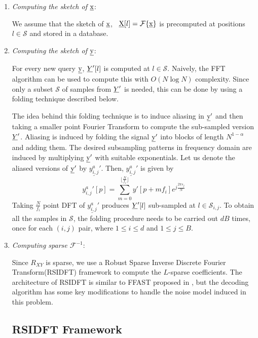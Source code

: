 \begin{enumerate}
	\item[\RNum{1}] \textit{Computing the sketch of $\underline{\mathrm{x}}$}: 
	
	 We assume that the sketch of $\underline{\mathrm{x}}$, \ $ \underline{\mathrm{X}}[l] = \mathcal{F}\{\underline{\mathrm{x}}\}$ is precomputed at positions $l \in \mathcal{S}$ and stored in a database.  
	
	\item[\RNum{2}] \textit{Computing the sketch of $\underline{\mathrm{y}}$}:
	
	 For every new query $\underline{\mathrm{y}}$, $ \underline{Y}'[l]$ is computed at $l \in \mathcal{S}$. Naively, the FFT algorithm can be used to compute this with $O(N \log N)$ complexity. Since only a subset $\mathcal{S}$ of samples from $\underline{Y}'$ is needed, this can be done by using a folding technique described below.
	 
	  The idea behind this folding technique is to induce aliasing in $\underline{\mathrm{y}}'$ and then taking a smaller point Fourier Transform to compute the sub-sampled version $\underline{Y}'$. Aliasing is induced by folding the signal $\underline{\mathrm{y}}'$ into blocks of length $N^{1-\alpha}$ and adding them. The desired subsampling patterns in frequency domain are induced by multiplying $\underline{\mathrm{y}}'$ with suitable exponentials. Let us denote the aliased versions of $\underline{\mathrm{y}}'$ by $\underline{y^{a}_{i,j}}'$. Then, $\underline{y^{a}_{i,j}}'$ is given by
	  \begin{equation}
	  	{y^{a}_{i,j}}'[p] = \sum \limits_{m = 0}^{\lfloor{\frac{N}{f_i}}\rfloor} y'[p + mf_i] e^{j \frac{2 \pi s_j}{N} } 
	  \end{equation}
	  Taking $\frac{N}{f_i}$ point DFT of $\underline{y^{a}_{i,j}}'$ produces $\underline{Y}'[l]$ sub-sampled at $l \in \mathcal{S}_{i,j}$. To obtain all the samples in $\mathcal{S}$, the folding procedure needs to be carried out $dB$ times, once for each $(i,j)$ pair, where $1 \leq i \leq d $ and  $1 \leq j \leq B $.  
	       
	\item[\RNum{3}] \textit{Computing sparse $\mathcal{F}^{-1}$}: 
	
	 Since $R_{XY}$ is sparse, we use a Robust Sparse Inverse  Discrete Fourier Transform(RSIDFT) framework to compute the $L$-sparse coefficients. The architecture of RSIDFT is similar to FFAST proposed in \cite{pawar2014robust}, but the decoding algorithm has some key modifications to handle the noise model induced in this problem.
	 
	 
	 \subsection{RSIDFT Framework} 	\label{sec:RSIDFT}
	

\end{enumerate}
